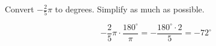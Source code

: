 Convert $-\frac{2}{5}\pi$ to degrees. Simplify as much as possible.

$$
-\frac{2}{5}\pi \cdot \frac{180^{\circ}}{\pi} = -\frac{180^{\circ} \cdot 2}{5} = -72^{\circ}
$$
